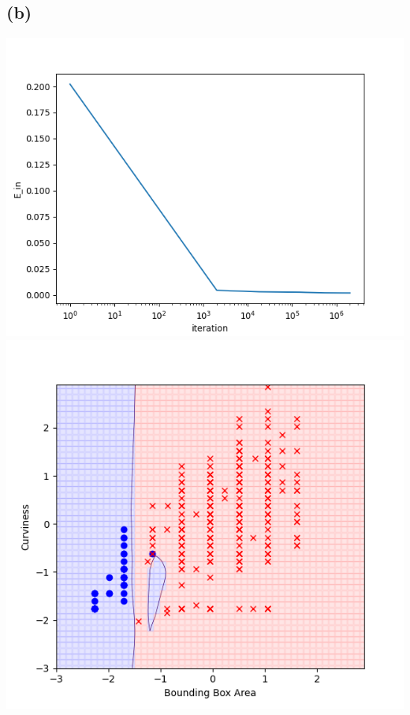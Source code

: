 \documentclass{article}
\begin{document}
	\subsection*{(b)}
		\includegraphics[scale=0.8]{2b1}\\
		\includegraphics[scale=0.8]{2b2}
		
\end{document}
